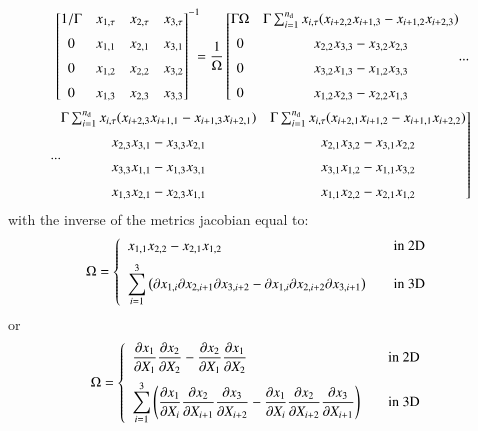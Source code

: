 \documentclass{warpdoc}
\newcommand{\alb}{\vspace{0.2cm}\\} %
\newcommand{\nd}{{{n}_{\rm d}}}
\newcommand{\mfd}{\displaystyle}
\begin{document}
\begin{equation}
 \label{eqn:chainrule-inv-3D}
 \begin{array}{@{}r@{}}
  \left[
    \begin{array}{@{}cccc@{}}
       1/\Gamma & x_{1,\tau} & x_{2,\tau} & x_{3,\tau} \alb
       0        & x_{1,1}    & x_{2,1}    & x_{3,1} \alb
       0        & x_{1,2}    & x_{2,2}    & x_{3,2} \alb
       0        & x_{1,3}    & x_{2,3}    & x_{3,3}
    \end{array}
  \right]^{-1}
  \!\!\!=\mfd\frac{1}{\Omega}
  \left[
    \begin{array}{@{}cc@{}}
       \Gamma\Omega & \Gamma \sum_{i=1}^\nd x_{i,\tau} (x_{i+2,2}x_{i+1,3}-x_{i+1,2}x_{i+2,3}) \alb
       0        & x_{2,2}x_{3,3}-x_{3,2} x_{2,3} \alb
       0        & x_{3,2}x_{1,3}-x_{1,2} x_{3,3}  \alb
       0        & x_{1,2}x_{2,3}-x_{2,2} x_{1,3}
    \end{array}...
  \right. \alb
  \left. ...
    \begin{array}{@{}cc@{}}
       \Gamma \sum_{i=1}^\nd x_{i,\tau} (x_{i+2,3}x_{i+1,1}-x_{i+1,3}x_{i+2,1}) & \Gamma \sum_{i=1}^\nd x_{i,\tau} (x_{i+2,1}x_{i+1,2}-x_{i+1,1}x_{i+2,2})\alb
       x_{2,3}x_{3,1}-x_{3,3} x_{2,1} & x_{2,1}x_{3,2}-x_{3,1} x_{2,2}  \alb
       x_{3,3}x_{1,1}-x_{1,3} x_{3,1} & x_{3,1}x_{1,2}-x_{1,1} x_{3,2} \alb
       x_{1,3}x_{2,1}-x_{2,3} x_{1,1} & x_{1,1}x_{2,2}-x_{2,1} x_{1,2}
    \end{array}
  \right]
 \end{array}
\end{equation}
%
with the inverse of the metrics jacobian equal to:
%
\begin{equation}
\Omega=\left\{ \begin{array}{ll}\mfd
x_{1,1}x_{2,2}-x_{2,1}x_{1,2} &\textrm{~~~~in~2D} \alb\mfd
\sum_{i=1}^{3} \left(
    \partial x_{1,i} \partial x_{2,i+1} \partial x_{3,i+2}
   -\partial x_{1,i} \partial x_{2,i+2} \partial x_{3,i+1} \right)
& \textrm{~~~~in~3D}
\end{array}\right.
\end{equation}
%
or
%
\begin{equation}
\Omega=\left\{ \begin{array}{ll}\mfd
\frac{\partial x_1}{\partial X_1}\frac{\partial x_2}{\partial X_2}-\frac{\partial x_2}{\partial X_1}\frac{\partial x_1}{\partial X_2} &\textrm{~~~~in~2D} \alb\mfd
\sum_{i=1}^{3} \left(
    \frac{\partial x_1}{\partial X_i} \frac{\partial x_2}{\partial X_{i+1}} \frac{\partial x_3}{\partial X_{i+2}}
   -\frac{\partial x_1}{\partial X_i} \frac{\partial x_2}{\partial X_{i+2}} \frac{\partial x_3}{\partial X_{i+1}} \right)
& \textrm{~~~~in~3D}
\end{array}\right.
\label{eqn:Omega}
\end{equation}
\end{document}
